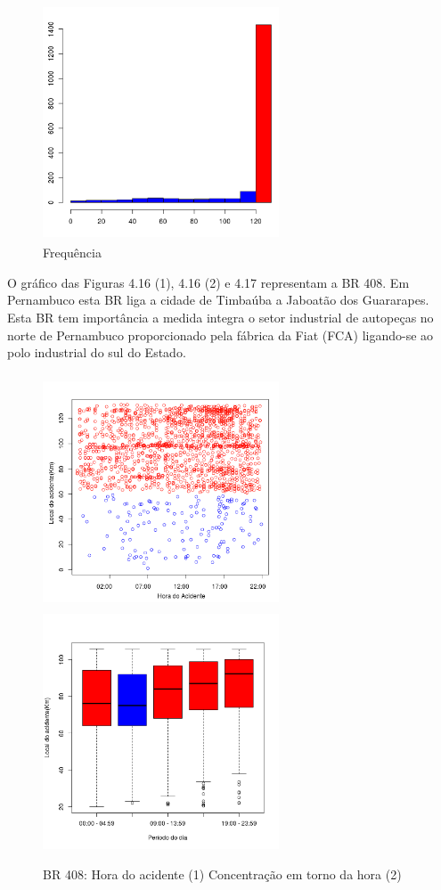 \quad
\begin{figure}[h]
	\centering
	\caption{ Frequência}
	\includegraphics[width=7cm,height=7cm]{Figuras/Preprocess/br407_2.png}
\end{figure}



\pagebreak

O gráfico das Figuras 4.16 (1), 4.16 (2)  e 4.17 representam a BR 408. Em Pernambuco esta BR liga a cidade de Timbaúba a Jaboatão dos Guararapes. Esta BR tem importância a medida integra o setor industrial de autopeças no norte de Pernambuco proporcionado pela fábrica da Fiat (FCA) ligando-se ao polo industrial do sul do Estado. 

\begin{figure}[h]
	\caption{BR 408: Hora do acidente (1) Concentração em torno da hora (2)}
	\includegraphics[width=7cm,height=7cm]{Figuras/Preprocess/br408_1.png}
	\includegraphics[width=7cm,height=7cm]{Figuras/Preprocess/br408_2.png}

\end{figure}

